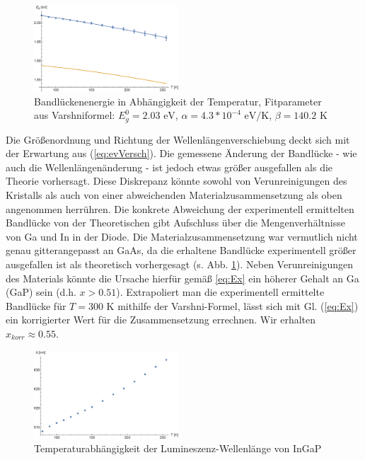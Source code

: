 \documentclass[aps,twocolumn,secnumarabic,nobalancelastpage,amsmath,amssymb,
nofootinbib,superscriptaddress]{revtex4-1}
\begin{document}
\begin{figure}[t]
  \centering
  \includegraphics[width=0.48\textwidth]{../Messung/energtemp.eps}
  \caption{\label{fig:EgapT} Bandlückenenergie in Abhängigkeit der Temperatur, Fitparameter
  aus Varshniformel: $E_g^0= 2.03 \text{ eV}$, $\alpha = 4.3*10^{-4}\text{ eV/K}$, $\beta = 140.2 \text{ K}$}
\end{figure}

\noindent Die Größenordnung und Richtung der Wellenlängenverschiebung deckt sich mit der Erwartung aus (\ref{eq:evVersch}).
Die gemessene Änderung der Bandlücke - wie auch die Wellenlängenänderung - ist jedoch etwas größer ausgefallen als die Theorie vorhersagt.
Diese Diskrepanz könnte sowohl von Verunreinigungen des Kristalls als auch von einer abweichenden Materialzusammensetzung als oben angenommen
herrühren. Die konkrete Abweichung der experimentell ermittelten Bandlücke von der Theoretischen gibt Aufschluss über die Mengenverhältnisse von
Ga und In in der Diode. Die Materialzusammensetzung war vermutlich nicht genau gitterangepasst an GaAs, da die erhaltene
Bandlücke experimentell größer ausgefallen ist als theoretisch vorhergesagt (s. Abb. \ref{fig:EgapT}). Neben Verunreinigungen des Materials könnte
die Ursache hierfür gemäß \ref{eq:Ex} ein höherer Gehalt an Ga (GaP) sein (d.h. $x>0.51$).
Extrapoliert man die experimentell ermittelte Bandlücke für $T=300\text{ K}$ mithilfe der Varshni-Formel, lässt sich mit Gl. (\ref{eq:Ex})
ein korrigierter Wert für die Zusammensetzung errechnen. Wir erhalten $x_{korr}\approx 0.55$.

\begin{figure}[h]
  \centering
  \includegraphics[width=0.48\textwidth]{../Messung/peaktemp.eps}
  \caption{\label{fig:lamT} Temperaturabhängigkeit der Lumineszenz-Wellenlänge von InGaP}
\end{figure}
\end{document}
